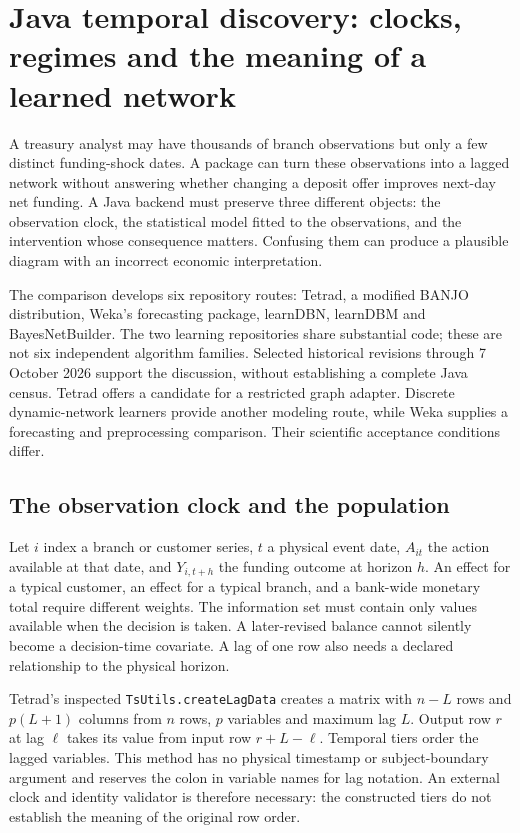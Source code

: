 \section{Java temporal discovery: clocks, regimes and the meaning of a learned network}
\label{exec15:java-temporal}

A treasury analyst may have thousands of branch observations but only a few
distinct funding-shock dates. A package can turn these observations into a
lagged network without answering whether changing a deposit offer improves
next-day net funding. A Java backend must preserve three different objects:
the observation clock, the statistical model fitted to the observations, and
the intervention whose consequence matters. Confusing them can produce a
plausible diagram with an incorrect economic interpretation.

The comparison develops six repository routes: Tetrad, a modified BANJO
distribution, Weka's forecasting package, learnDBN, learnDBM and
BayesNetBuilder. The two learning repositories share substantial code; these
are not six independent algorithm families. Selected historical revisions
through 7 October 2026 support the discussion, without establishing a complete
Java census. Tetrad offers a candidate for a restricted graph adapter. Discrete
dynamic-network learners provide another modeling route, while Weka supplies
a forecasting and preprocessing comparison. Their scientific acceptance
conditions differ.~\citep{exec15_javatemporal_tetrad,exec15_javatemporal_banjo,
exec15_javatemporal_weka,exec15_javatemporal_learndbn,
exec15_javatemporal_learndbm,exec15_javatemporal_builder}

\subsection{The observation clock and the population}

Let $i$ index a branch or customer series, $t$ a physical event date, $A_{it}$
the action available at that date, and $Y_{i,t+h}$ the funding outcome at horizon
$h$. An effect for a typical customer, an effect for a typical branch, and a
bank-wide monetary total require different weights. The information set must
contain only values available when the decision is taken. A later-revised
balance cannot silently become a decision-time covariate. A lag of one row
also needs a declared relationship to the physical horizon.

Tetrad's inspected \texttt{TsUtils.createLagData} creates a matrix with $n-L$
rows and $p(L+1)$ columns from $n$ rows, $p$ variables and maximum lag $L$.
Output row $r$ at lag $\ell$ takes its value from input row $r+L-\ell$.
Temporal tiers order the lagged variables. This method has no physical
timestamp or subject-boundary argument and reserves the colon in variable
names for lag notation. An external clock and identity validator is therefore
necessary: the constructed tiers do not establish the meaning of the original
row order.~\citep{exec15_javatemporal_tetrad}

